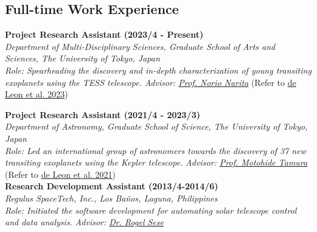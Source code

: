 \documentclass[12pt,letterpaper]{article}
\begin{document}
\subsection{Full-time Work Experience}
\begin{list}{}{\cvlist}
    \item
        \textbf{Project Research Assistant (2023/4 - Present)} \\
        \textit{Department of Multi-Disciplinary Sciences, Graduate School of Arts and Sciences, The University of Tokyo, Japan} \\
        \textit{Role: Spearheading the discovery and in-depth characterization of young transiting exoplanets using the TESS telescope.}
        \textit{Advisor: \href{\naritaurl}{Prof. Norio Narita}} (Refer to \href{\paperthree}{de Leon et al. 2023})\\

    \item
        \textbf{Project Research Assistant (2021/4 - 2023/3)} \\
        \textit{Department of Astronomy, Graduate School of Science, The University of Tokyo, Japan} \\
        \textit{Role: Led an international group of astronomers towards the discovery of 37 new transiting exoplanets using the Kepler telescope.}
        \textit{Advisor: \href{tamuraurl}{Prof. Motohide Tamura}} (Refer to \href{\papertwo}{de Leon et al. 2021})\\

        \textbf{Research Development Assistant (2013/4-2014/6)}\\
        \textit{Regulus SpaceTech, Inc., Los Ba\~nos, Laguna, Philippines}\\
        \textit{Role: Initiated the software development for automating solar telescope control and data analysis.}
        \textit{Advisor: \href{\seseurl}{Dr. Rogel Sese}} \\
\end{list}
\end{document}
